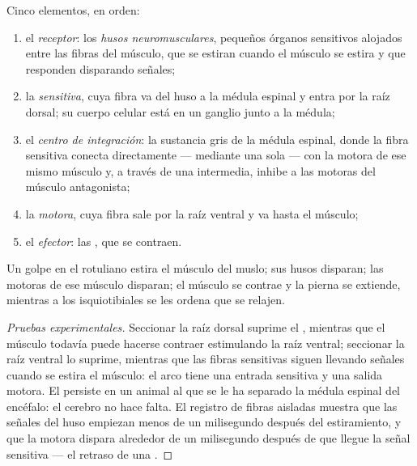 \begin{proposition}\label{prop:g12:stretch-reflex:arc}
Cinco elementos, en orden:
\begin{enumerate}
  \item el \emph{receptor}: los \emph{husos neuromusculares}, pequeños
        órganos sensitivos alojados entre las fibras del músculo, que
        se estiran cuando el músculo se estira y que responden
        disparando señales;
  \item la \emph{ sensitiva}, cuya fibra va del huso a la médula
        espinal y entra por la raíz dorsal; su cuerpo celular está en
        un ganglio junto a la médula;
  \item el \emph{centro de integración}: la sustancia gris de la médula
        espinal, donde la fibra sensitiva conecta directamente ---
        mediante una sola  --- con la  motora de ese
        mismo músculo y, a través de una  intermedia, inhibe a
        las  motoras del músculo antagonista;
  \item la \emph{ motora}, cuya fibra sale por la raíz ventral y
        va hasta el músculo;
  \item el \emph{efector}: las , que se contraen.
\end{enumerate}
Un golpe en el  rotuliano estira el músculo del muslo; sus husos
disparan; las  motoras de ese músculo disparan; el músculo se
contrae y la pierna se extiende, mientras a los isquiotibiales se les
ordena que se relajen.
\end{proposition}
\begin{proof}[Pruebas experimentales]
Seccionar la raíz dorsal suprime el , mientras que el músculo
todavía puede hacerse contraer estimulando la raíz ventral; seccionar
la raíz ventral lo suprime, mientras que las fibras sensitivas siguen
llevando señales cuando se estira el músculo: el arco tiene una entrada
sensitiva y una salida motora. El  persiste en un animal al que
se le ha separado la médula espinal del encéfalo: el cerebro no hace
falta. El registro de fibras aisladas muestra que las señales del huso
empiezan menos de un milisegundo después del estiramiento, y que la
 motora dispara alrededor de un milisegundo después de que
llegue la señal sensitiva --- el retraso de una .
\end{proof}

